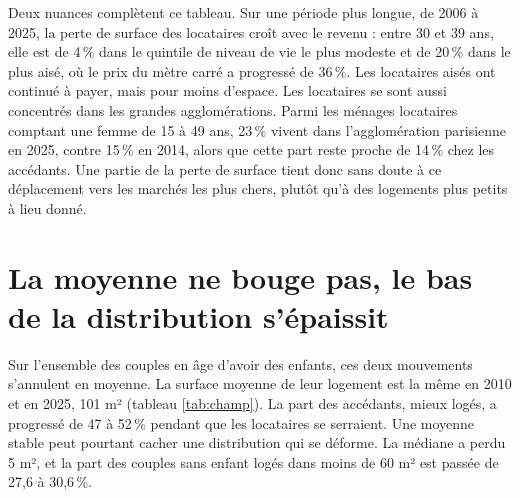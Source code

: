 \documentclass[11pt,a4paper]{article}
\begin{document}
Deux nuances complètent ce tableau. Sur une période plus longue, de 2006 à 2025, la perte de surface des locataires croît avec le revenu : entre 30 et 39 ans, elle est de 4\,\% dans le quintile de niveau de vie le plus modeste et de 20\,\% dans le plus aisé, où le prix du mètre carré a progressé de 36\,\%. Les locataires aisés ont continué à payer, mais pour moins d'espace. Les locataires se sont aussi concentrés dans les grandes agglomérations. Parmi les ménages locataires comptant une femme de 15 à 49 ans, 23\,\% vivent dans l'agglomération parisienne en 2025, contre 15\,\% en 2014, alors que cette part reste proche de 14\,\% chez les accédants. Une partie de la perte de surface tient donc sans doute à ce déplacement vers les marchés les plus chers, plutôt qu'à des logements plus petits à lieu donné.

\section{La moyenne ne bouge pas, le bas de la distribution s'épaissit}

Sur l'ensemble des couples en âge d'avoir des enfants, ces deux mouvements s'annulent en moyenne. La surface moyenne de leur logement est la même en 2010 et en 2025, 101 m² (tableau \ref{tab:champ}). La part des accédants, mieux logés, a progressé de 47 à 52\,\% pendant que les locataires se serraient. Une moyenne stable peut pourtant cacher une distribution qui se déforme. La médiane a perdu 5 m², et la part des couples sans enfant logés dans moins de 60 m² est passée de 27,6 à 30,6\,\%.
\end{document}
